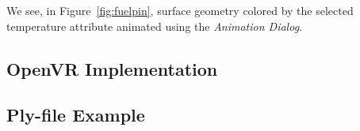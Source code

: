 We see, in Figure~\ref{fig:fuelpin}, surface geometry colored by the selected temperature attribute animated using the \textit{Animation Dialog}.

\subsection{OpenVR Implementation}

\subsection{Ply-file Example}

